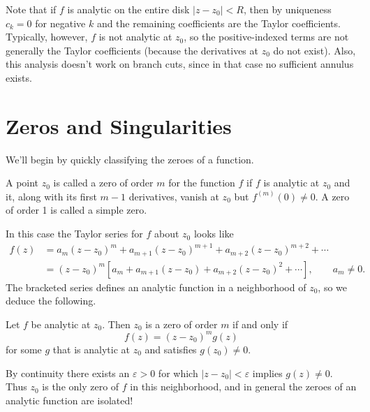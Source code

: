 \documentclass[../m136main.tex]{subfiles}
\begin{document}
Note that if $f$ is analytic on the entire disk $|z - z_0| < R$, then by uniqueness $c_k = 0$ for negative $k$ and the remaining coefficients are the Taylor coefficients.
Typically, however, $f$ is not analytic at $z_0$, so the positive-indexed terms are not generally the Taylor coefficients (because the derivatives at $z_0$ do not exist).
Also, this analysis doesn't work on branch cuts, since in that case no sufficient annulus exists.

\section{Zeros and Singularities}
We'll begin by quickly classifying the zeroes of a function.

\begin{definition}
    A point $z_0$ is called a zero of order $m$ for the function $f$ if $f$ is analytic at $z_0$ and it, along with its first $m-1$ derivatives, vanish at $z_0$ but $f^{(m)}(0) \neq 0$.
    A zero of order 1 is called a simple zero.
\end{definition}

In this case the Taylor series for $f$ about $z_0$ looks like
\begin{align*}
    f(z) &= a_m (z - z_0)^{m} + a_{m+1} (z - z_0)^{m+1} + a_{m+2} (z - z_0)^{m+2} + \cdots \\
    &= (z - z_0)^{m} \left[ a_m + a_{m+1} (z - z_0) + a_{m+2} (z - z_0)^2 + \cdots \right], \qquad a_m \neq 0.
\end{align*}
The bracketed series defines an analytic function in a neighborhood of $z_0$, so we deduce the following.

\begin{theorem}[]
    Let $f$ be analytic at $z_0$.
    Then $z_0$ is a zero of order $m$ if and only if
    \[ f(z) = (z - z_0)^{m} g(z) \]
    for some $g$ that is analytic at $z_0$ and satisfies $g(z_0) \neq 0$.
\end{theorem}

By continuity there exists an $\varepsilon > 0$ for which $|z - z_0| < \varepsilon$ implies $g(z) \neq 0$.
Thus $z_0$ is the only zero of $f$ in this neighborhood, and in general the zeroes of an analytic function are isolated!
\end{document}
